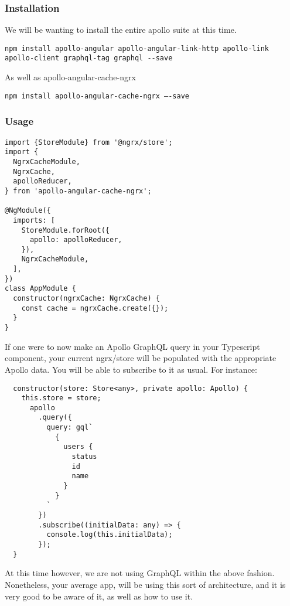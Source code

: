 \subsubsection{ Installation }
We will be wanting to install the entire apollo suite at this time.
\begin{lstlisting}
npm install apollo-angular apollo-angular-link-http apollo-link apollo-client graphql-tag graphql --save
\end{lstlisting}
As well as apollo-angular-cache-ngrx
\begin{lstlisting}
npm install apollo-angular-cache-ngrx —-save
\end{lstlisting}

\subsubsection{ Usage }
\begin{lstlisting}
import {StoreModule} from '@ngrx/store';
import {
  NgrxCacheModule,
  NgrxCache,
  apolloReducer,
} from 'apollo-angular-cache-ngrx';

@NgModule({
  imports: [
    StoreModule.forRoot({
      apollo: apolloReducer,
    }),
    NgrxCacheModule,
  ],
})
class AppModule {
  constructor(ngrxCache: NgrxCache) {
    const cache = ngrxCache.create({});
  }
}
\end{lstlisting}

If one were to now make an Apollo GraphQL query in your Typescript component,
your current ngrx/store will be populated with the appropriate Apollo data.
You will be able to subscribe to it as usual. For instance:
\begin{lstlisting}
  constructor(store: Store<any>, private apollo: Apollo) {
    this.store = store;
      apollo
        .query({
          query: gql`
            {
              users {
                status
                id
                name
              }
            }
          `
        })
        .subscribe((initialData: any) => {
          console.log(this.initialData);
        });
  }
\end{lstlisting}

At this time however, we are not using GraphQL within the above fashion.
Nonetheless, your average app, will be using this sort of architecture, and it
is very good to be aware of it, as well as how to use it.
